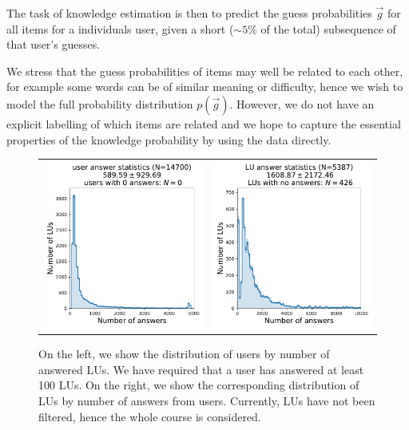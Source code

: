 The task of knowledge estimation is then to predict the guess probabilities $\vec{g}$ for all items for a individuals user, given a short ($\sim5\%$ of the total) subsequence of that user's guesses.

We stress that the guess probabilities of items may well be related to each other, for example some words can be of similar meaning or difficulty, hence we wish to model the full probability distribution $p(\vec{g})$. However, we do not have an explicit labelling of which items are related and we hope to capture the essential properties of the knowledge probability by using the data directly.

\begin{figure}[ht]
\centering
\begin{tabular}{cc}
\includegraphics[width=0.4\linewidth]{figures/lingvist/user_answer_distribution.pdf} &
\includegraphics[width=0.4\linewidth]{figures/lingvist/lu_answer_distribution.pdf} \\
\end{tabular}
\caption{On the left, we show the distribution of users by number of answered LUs. We have required that a user has answered at least 100 LUs. On the right, we show the corresponding distribution of LUs by number of answers from users. Currently, LUs have not been filtered, hence the whole course is considered.} 
\label{fig:user_lu_distribution} 
\end{figure} 

